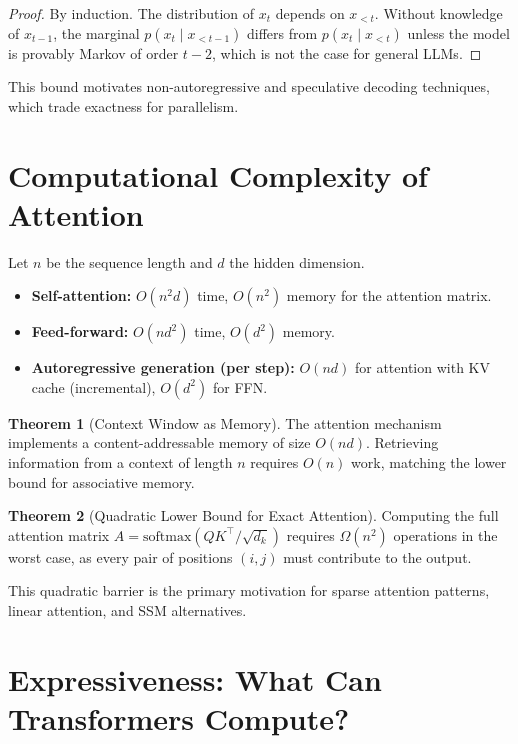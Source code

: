 \documentclass[11pt,a4paper]{book}
\theoremstyle{definition}
\newtheorem{theorem}{Theorem}[chapter]
\begin{document}
\begin{proof}
	By induction. The distribution of $x_t$ depends on $x_{<t}$. Without knowledge of $x_{t-1}$, the marginal $p(x_t \mid x_{<t-1})$ differs from $p(x_t \mid x_{<t})$ unless the model is provably Markov of order $t-2$, which is not the case for general LLMs.
\end{proof}

This bound motivates non-autoregressive and speculative decoding techniques, which trade exactness for parallelism.

\section{Computational Complexity of Attention}

Let $n$ be the sequence length and $d$ the hidden dimension.

\begin{itemize}
	\item \textbf{Self-attention:} $O(n^2 d)$ time, $O(n^2)$ memory for the attention matrix.
	\item \textbf{Feed-forward:} $O(n d^2)$ time, $O(d^2)$ memory.
	\item \textbf{Autoregressive generation (per step):} $O(n d)$ for attention with KV cache (incremental), $O(d^2)$ for FFN.
\end{itemize}

\begin{theorem}[Context Window as Memory]
	The attention mechanism implements a content-addressable memory of size $O(n d)$. Retrieving information from a context of length $n$ requires $O(n)$ work, matching the lower bound for associative memory.
\end{theorem}

\begin{theorem}[Quadratic Lower Bound for Exact Attention]
	Computing the full attention matrix $A = \text{softmax}(Q K^\top / \sqrt{d_k})$ requires $\Omega(n^2)$ operations in the worst case, as every pair of positions $(i, j)$ must contribute to the output.
\end{theorem}

This quadratic barrier is the primary motivation for sparse attention patterns, linear attention, and SSM alternatives.

\section{Expressiveness: What Can Transformers Compute?}
\end{document}
